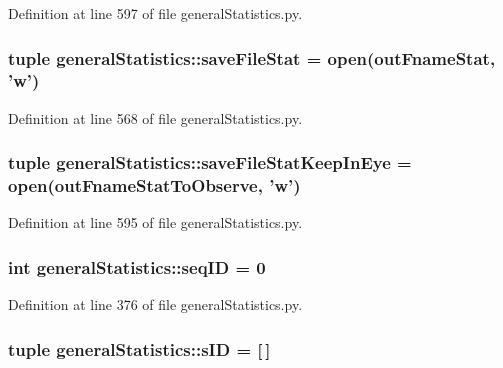 \-Definition at line 597 of file general\-Statistics.\-py.

\hypertarget{namespacegeneral_statistics_a5db80fc99086fc28f22bf3c86c99ea41}{
\subsubsection[{save\-File\-Stat}]{\setlength{\rightskip}{0pt plus 5cm}tuple {\bf general\-Statistics\-::save\-File\-Stat} = open({\bf out\-Fname\-Stat}, 'w')}}\label{namespacegeneral_statistics_a5db80fc99086fc28f22bf3c86c99ea41}


\-Definition at line 568 of file general\-Statistics.\-py.

\hypertarget{namespacegeneral_statistics_a6d34190172987c2f4683421687406e59}{
\subsubsection[{save\-File\-Stat\-Keep\-In\-Eye}]{\setlength{\rightskip}{0pt plus 5cm}tuple {\bf general\-Statistics\-::save\-File\-Stat\-Keep\-In\-Eye} = open({\bf out\-Fname\-Stat\-To\-Observe}, 'w')}}\label{namespacegeneral_statistics_a6d34190172987c2f4683421687406e59}


\-Definition at line 595 of file general\-Statistics.\-py.

\hypertarget{namespacegeneral_statistics_a7f7cffe1bc7c0281cbf5c6c41582d50d}{
\subsubsection[{seq\-I\-D}]{\setlength{\rightskip}{0pt plus 5cm}int {\bf general\-Statistics\-::seq\-I\-D} = 0}}\label{namespacegeneral_statistics_a7f7cffe1bc7c0281cbf5c6c41582d50d}


\-Definition at line 376 of file general\-Statistics.\-py.

\hypertarget{namespacegeneral_statistics_a3796f56e86ab8d479fbfeb68a5f67b01}{
\subsubsection[{s\-I\-D}]{\setlength{\rightskip}{0pt plus 5cm}tuple {\bf general\-Statistics\-::s\-I\-D} = \mbox{[}$\,$\mbox{]}}}\label{namespacegeneral_statistics_a3796f56e86ab8d479fbfeb68a5f67b01}


